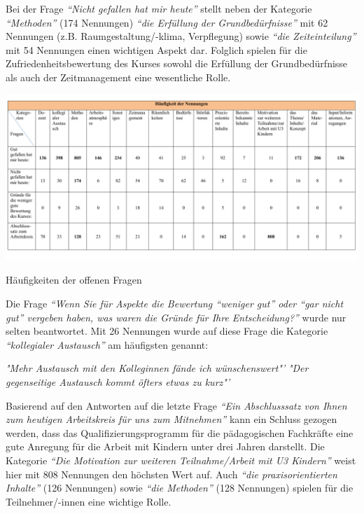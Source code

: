 \documentclass[12pt,a4paper]{article}
\begin{document}
Bei der Frage \textit{"`Nicht gefallen hat mir heute"'} stellt neben der Kategorie \textit{"`Methoden"' }(174 Nennungen)\textit{ "`die Erfüllung der Grundbedürfnisse"'} mit 62 Nennungen (z.B. Raumgestaltung/-klima, Verpflegung) sowie \textit{"`die Zeiteinteilung"'} mit 54 Nennungen einen wichtigen Aspekt dar. Folglich spielen für die Zufriedenheitsbewertung des Kurses sowohl die Erfüllung der Grundbedürfnisse als auch der Zeitmanagement eine wesentliche Rolle. 

\begin{table}[!ht]
\includegraphics[scale=0.71,angle=90]{tab04.pdf}
\caption{Häufigkeiten der offenen Fragen}
\label{tab.9}
\end{table}

Die Frage \textit{"`Wenn Sie für Aspekte die Bewertung "`weniger gut"' oder "`gar nicht gut"' vergeben haben, was waren die Gründe für Ihre Entscheidung?"'} wurde nur selten beantwortet. Mit 26 Nennungen wurde auf diese Frage die Kategorie \textit{"`kollegialer Austausch"'} am häufigsten genannt:

\textit{ "Mehr Austausch mit den Kolleginnen fände ich wünschenswert"'}
\textit{ "Der gegenseitige Austausch kommt öfters etwas zu kurz"'}

Basierend auf den Antworten auf die letzte Frage \textit{"`Ein Abschlusssatz von Ihnen zum heutigen Arbeitskreis für uns zum Mitnehmen"'} kann ein Schluss gezogen werden, dass das Qualifizierungsprogramm für die pädagogischen Fachkräfte eine gute Anregung für die Arbeit mit Kindern unter drei Jahren darstellt. Die Kategorie \textit{"`Die Motivation zur weiteren Teilnahme/Arbeit mit U3 Kindern"'} weist hier mit 808 Nennungen den höchsten Wert auf. Auch \textit{"`die praxisorientierten Inhalte"'} (126 Nennungen) sowie \textit{"`die Methoden"'} (128 Nennungen) spielen für die Teilnehmer/-innen eine wichtige Rolle. 
\end{document}
